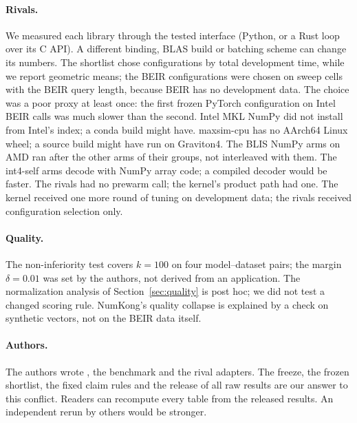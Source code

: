 \paragraph{Rivals.}
We measured each library through the tested interface (Python, or a Rust loop over its C API).
A different binding, BLAS build or batching scheme can change its numbers.
The shortlist chose configurations by total development time, while we report geometric means; the BEIR configurations were chosen on sweep cells with the BEIR query length, because BEIR has no development data.
The choice was a poor proxy at least once: the first frozen PyTorch configuration on Intel BEIR calls was much slower than the second.
Intel MKL NumPy did not install from Intel's index; a conda build might have.
maxsim-cpu has no AArch64 Linux wheel; a source build might have run on Graviton4.
The BLIS NumPy arms on AMD ran after the other arms of their groups, not interleaved with them.
The int4-self arms decode with NumPy array code; a compiled decoder would be faster.
The rivals had no prewarm call; the kernel's product path had one.
The kernel received one more round of tuning on development data; the rivals received configuration selection only.

\paragraph{Quality.}
The non-inferiority test covers $k = 100$ on four model--dataset pairs; the margin $\delta = 0.01$ was set by the authors, not derived from an application.
The normalization analysis of Section~\ref{sec:quality} is post hoc; we did not test a changed scoring rule.
NumKong's quality collapse is explained by a check on synthetic vectors, not on the BEIR data itself.

\paragraph{Authors.}
The authors wrote \sweet, the benchmark and the rival adapters.
The freeze, the frozen shortlist, the fixed claim rules and the release of all raw results are our answer to this conflict.
Readers can recompute every table from the released results.
An independent rerun by others would be stronger.
